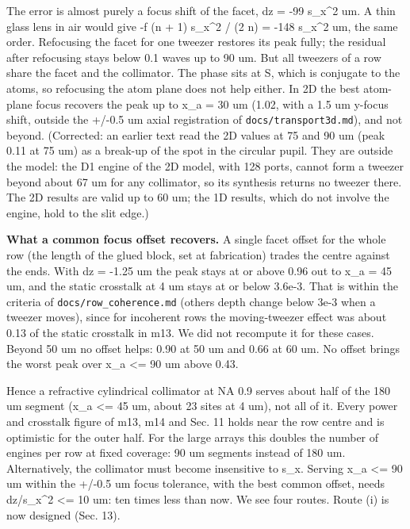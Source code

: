 The error is almost purely a focus shift of the facet, dz = -99
s\_x\^{}2 um. A thin glass lens in air would give -f (n + 1) s\_x\^{}2 /
(2 n) = -148 s\_x\^{}2 um, the same order. Refocusing the facet for one
tweezer restores its peak fully; the residual after refocusing stays
below 0.1 waves up to 90 um. But all tweezers of a row share the facet
and the collimator. The phase sits at S, which is conjugate to the
atoms, so refocusing the atom plane does not help either. In 2D the best
atom-plane focus recovers the peak up to x\_a = 30 um (1.02, with a 1.5
um y-focus shift, outside the +/-0.5 um axial registration of
\texttt{docs/transport3d.md}), and not beyond. (Corrected: an earlier
text read the 2D values at 75 and 90 um (peak 0.11 at 75 um) as a
break-up of the spot in the circular pupil. They are outside the model:
the D1 engine of the 2D model, with 128 ports, cannot form a tweezer
beyond about 67 um for any collimator, so its synthesis returns no
tweezer there. The 2D results are valid up to 60 um; the 1D results,
which do not involve the engine, hold to the slit edge.)

\textbf{What a common focus offset recovers.} A single facet offset for
the whole row (the length of the glued block, set at fabrication) trades
the centre against the ends. With dz = -1.25 um the peak stays at or
above 0.96 out to \textbar x\_a\textbar{} = 45 um, and the static
crosstalk at 4 um stays at or below 3.6e-3. That is within the criteria
of \texttt{docs/row\_coherence.md} (others\textquotesingle{} depth
change below 3e-3 when a tweezer moves), since for incoherent rows the
moving-tweezer effect was about 0.13 of the static crosstalk in m13. We
did not recompute it for these cases. Beyond 50 um no offset helps: 0.90
at 50 um and 0.66 at 60 um. No offset brings the worst peak over
\textbar x\_a\textbar{} \textless= 90 um above 0.43.

Hence a refractive cylindrical collimator at NA 0.9 serves about half of
the 180 um segment (\textbar x\_a\textbar{} \textless= 45 um, about 23
sites at 4 um), not all of it. Every power and crosstalk figure of m13,
m14 and Sec. 11 holds near the row centre and is optimistic for the
outer half. For the large arrays this doubles the number of engines per
row at fixed coverage: 90 um segments instead of 180 um. Alternatively,
the collimator must become insensitive to s\_x. Serving
\textbar x\_a\textbar{} \textless= 90 um within the +/-0.5 um focus
tolerance, with the best common offset, needs
\textbar dz/s\_x\^{}2\textbar{} \textless= 10 um: ten times less than
now. We see four routes. Route (i) is now designed (Sec. 13).

